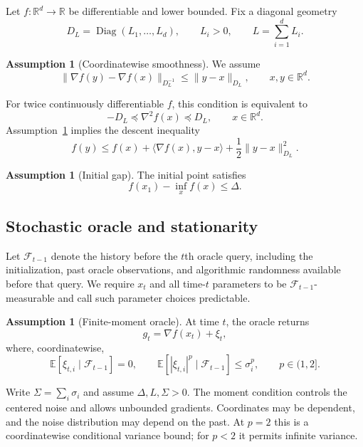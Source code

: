 \documentclass[11pt,letterpaper]{article}
\theoremstyle{definition}
\newtheorem{assumption}[theorem]{Assumption}
\newcommand{\E}{\mathbb E}
\newcommand{\R}{\mathbb R}
\newcommand{\F}{\mathcal F}
\newcommand{\grad}{\nabla}
\newcommand{\Diag}{\operatorname{Diag}}
\begin{document}
Let $f:\R^d\to\R$ be differentiable and lower bounded. Fix a diagonal geometry
\[
D_L=\Diag(L_1,\ldots,L_d),
\qquad L_i>0,
\qquad L=\sum_{i=1}^dL_i.
\]
\begin{assumption}[Coordinatewise smoothness]
\label{ass:gc}
We assume
\begin{equation}
\|\grad f(y)-\grad f(x)\|_{D_L^{-1}}
\le \|y-x\|_{D_L},
\qquad x,y\in\R^d.
\label{eq:gc}
\end{equation}
\end{assumption}
For twice continuously differentiable $f$, this condition is equivalent to
\[
-D_L\preceq\nabla^2 f(x)\preceq D_L,\qquad x\in\R^d.
\]
Assumption~\ref{ass:gc} implies the descent inequality
\begin{equation}
f(y)\le f(x)+\langle\grad f(x),y-x\rangle
+\frac12\|y-x\|_{D_L}^2.
\label{eq:smooth-descent}
\end{equation}
\begin{assumption}[Initial gap]
\label{ass:gap}
The initial point satisfies
\begin{equation}
f(x_1)-\inf_x f(x)\le\Delta.
\label{eq:gap}
\end{equation}
\end{assumption}

\subsection{Stochastic oracle and stationarity}

Let $\F_{t-1}$ denote the history before the $t$th oracle query, including the initialization, past oracle observations, and algorithmic randomness available before that query. We require $x_t$ and all time-$t$ parameters to be $\F_{t-1}$-measurable and call such parameter choices predictable.

\begin{assumption}[Finite-moment oracle]
\label{ass:oracle}
At time $t$, the oracle returns
\[
g_t=\grad f(x_t)+\xi_t,
\]
where, coordinatewise,
\begin{equation}
\E[\xi_{t,i}\mid\F_{t-1}]=0,
\qquad
\E[|\xi_{t,i}|^p\mid\F_{t-1}]\le\sigma_i^p,
\qquad p\in(1,2].
\label{eq:oracle}
\end{equation}
\end{assumption}
Write $\Sigma=\sum_i\sigma_i$ and assume $\Delta,L,\Sigma>0$.
The moment condition controls the centered noise and allows unbounded gradients. Coordinates may be dependent, and the noise distribution may depend on the past. At $p=2$ this is a coordinatewise conditional variance bound; for $p<2$ it permits infinite variance.
\end{document}

